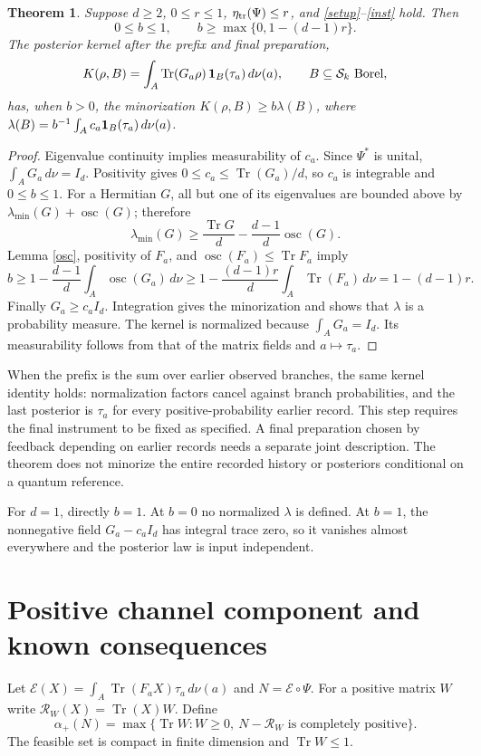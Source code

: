 \documentclass[11pt]{article}
\newtheorem{theorem}{Theorem}
\newcommand{\Tr}{\operatorname{Tr}}
\newcommand{\osc}{\operatorname{osc}}
\newcommand{\R}{\mathcal R}
\newcommand{\Sset}{\mathcal S}
\begin{document}
\begin{theorem}\label{main}
Suppose $d\ge2$, $0\le r\le1$, $\eta_{\rm tr}(\Psi)\le r$, and \eqref{setup}--\eqref{inst} hold. Then
\begin{equation}\label{bound}
 0\le b\le1,\qquad b\ge \max\{0,1-(d-1)r\}.
\end{equation}
The posterior kernel after the prefix and final preparation,
\[
 K(\rho,B)=\int_A \Tr(G_a\rho)\,{\bf1}_{B}(\tau_a)\,d\nu(a),
 \qquad B\subseteq \Sset_k\ \hbox{Borel},
\]
has, when $b>0$, the minorization $K(\rho,B)\ge b\lambda(B)$, where
$\lambda(B)=b^{-1}\int_A c_a{\bf1}_B(\tau_a)\,d\nu(a)$.
\end{theorem}
\begin{proof}
Eigenvalue continuity implies measurability of $c_a$. Since $\Psi^*$ is unital, $\int_A G_a\,d\nu=I_d$. Positivity gives
$0\le c_a\le\Tr(G_a)/d$, so $c_a$ is integrable and $0\le b\le1$.
For a Hermitian $G$, all but one of its eigenvalues are bounded above by $\lambda_{\min}(G)+\osc(G)$; therefore
\[
 \lambda_{\min}(G)\ge\frac{\Tr G}{d}-\frac{d-1}{d}\osc(G).
\]
Lemma \ref{osc}, positivity of $F_a$, and $\osc(F_a)\le\Tr F_a$ imply
\[
 b\ge1-\frac{d-1}{d}\int_A\osc(G_a)\,d\nu
 \ge1-\frac{(d-1)r}{d}\int_A\Tr(F_a)\,d\nu
 =1-(d-1)r.
\]
Finally $G_a\ge c_aI_d$. Integration gives the minorization and shows that $\lambda$ is a probability measure. The kernel is normalized because $\int_A G_a=I_d$. Its measurability follows from that of the matrix fields and $a\mapsto\tau_a$.
\end{proof}

When the prefix is the sum over earlier observed branches, the same kernel identity holds: normalization factors cancel against branch probabilities, and the last posterior is $\tau_a$ for every positive-probability earlier record. This step requires the final instrument to be fixed as specified. A final preparation chosen by feedback depending on earlier records needs a separate joint description. The theorem does not minorize the entire recorded history or posteriors conditional on a quantum reference.

For $d=1$, directly $b=1$. At $b=0$ no normalized $\lambda$ is defined. At $b=1$, the nonnegative field $G_a-c_aI_d$ has integral trace zero, so it vanishes almost everywhere and the posterior law is input independent.

\section{Positive channel component and known consequences}
Let $\mathcal E(X)=\int_A\Tr(F_aX)\tau_a\,d\nu(a)$ and $N=\mathcal E\circ\Psi$.
For a positive matrix $W$ write $\R_W(X)=\Tr(X)W$. Define
\[
 \alpha_+(N)=\max\{\Tr W:W\ge0,\ N-\R_W\text{ is completely positive}\}.
\]
The feasible set is compact in finite dimension and $\Tr W\le1$.
\end{document}
